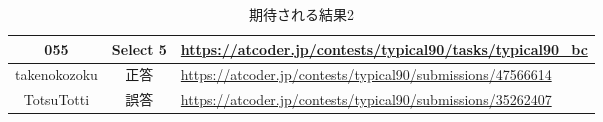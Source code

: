\begin{table}[h]
    \centering
    \caption{期待される結果2}
    \label{tab:55}
    \begin{adjustbox}{center}
    \begin{tabular}{|c|c|p{10cm}|}%
        \hline
        055 & Select 5 & \url{https://atcoder.jp/contests/typical90/tasks/typical90_bc} \\ \hline
        takenokozoku &正答 
        & \url{https://atcoder.jp/contests/typical90/submissions/47566614} \\ \hline
        TotsuTotti &誤答 
            
        & \url{https://atcoder.jp/contests/typical90/submissions/35262407} \\ \hline
    \end{tabular}
    \end{adjustbox}
\end{table}


